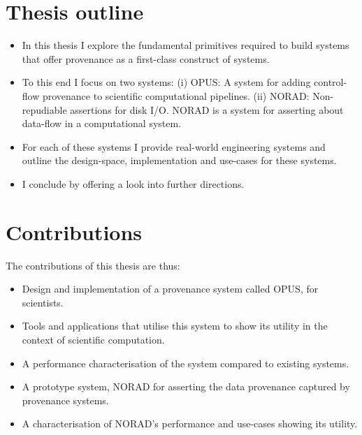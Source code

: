 \documentclass[withindex,glossary]{cam-thesis}
\begin{document}
\section{Thesis outline}
\begin{itemize}
\item In this thesis I explore the fundamental primitives required to build systems that offer provenance as a first-class construct
of systems.
\item To this end I focus on two systems:
(i) OPUS: A system for adding control-flow provenance to scientific computational pipelines.
(ii) NORAD: Non-repudiable assertions for disk I/O. NORAD is a system for asserting about data-flow in a computational system.
\item For each of these systems I provide real-world engineering systems and outline the design-space, implementation and use-cases for these systems.
\item I conclude by offering a look into further directions.
\end{itemize}

\section{Contributions}
The contributions of this thesis are thus:
\begin{itemize}
\item Design and implementation of a provenance system called OPUS, for scientists.
\item Tools and applications that utilise this system to show its utility in the context of scientific computation.
\item A performance characterisation of the system compared to existing systems.
\item A prototype system, NORAD for asserting the data provenance captured by provenance systems.
\item A characterisation of NORAD's performance and use-cases showing its utility.
\end{itemize}
\end{document}
